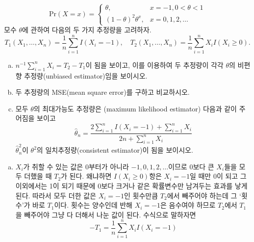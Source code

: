 \documentclass[answers]{exam}
\begin{document}
\begin{questions}
    \begin{equation}
      \mathrm{Pr}\left(X=x\right)=\begin{cases}\theta, & x=-1,0<\theta<1\\ \left(1-\theta\right)^{2}\theta^{x},& x=0,1,2,\ldots  \end{cases}
    \end{equation}
    모수 $\theta$에 관하여 다음의 두 가지 추정량을 고려하자.
    \begin{equation}
      T_{1}\left(X_{1},\ldots,X_{n}\right) = \dfrac{1}{n}\sum_{i=1}^{n}I\left(X_{i}=-1\right),\quad T_{2}\left(X_{1},\ldots,X_{n}\right) = \dfrac{1}{n}\sum_{i=1}^{n}X_{i}I\left(X_{i}\geq 0\right).
    \end{equation}
    \begin{enumerate}[(a)]
      \item $n^{-1}\sum_{i=1}^{n}X_{i}=T_{2}-T_{1}$이 됨을 보이고, 이를 이용하여 두 추정량이 각각 $\theta$의 비편향 추정량(unbiased estimator)임을 보이시오.
      \item 두 추정량의 MSE(mean square error)를 구하고 비교하시오.
      \item 모두 $\theta$의 최대가능도 추정량은 (maximum likelihood estimator) 다음과 같이 주어짐을 보이고
      \begin{equation}
        \widehat{\theta}_{n} = \dfrac{2\displaystyle \sum_{i=1}^{n}I\left(X_{i}=-1\right)+\sum_{i=1}^{n}X_{i}}{2n+\displaystyle \sum_{i=1}^{n}X_{i}}
      \end{equation}
      $\widehat{\theta}_{n}^{2}$이 $\theta^{2}$의 일치추정량(consistent estimator)이 됨을 보이시오.
    \end{enumerate}
    \begin{solution}
      \begin{enumerate}[(a)]
        \item $X_{i}$가 취할 수 있는 값은 $0$부터가 아니라 $-1,0,1,2,\ldots$이므로 0보다 큰 $X_{i}$들을 모두 더했을 때 $T_{2}$가 된다. 왜냐하면 $I\left(X_{i}\geq 0\right)$항은 $X_{i}=-1$일 때만 0이 되고 그 이외에서는 1이 되기 때문에 $0$보다 크거나 같은 확률변수만 남겨두는 효과를 낳게 된다. 따라서 모두 더한 값은 $X_{i}=-1$인 횟수만큼 $T_{2}$에서 빼주어야 하는데 그 `횟수'가 바로 $T_{1}$이다. 횟수는 양수인데 반해 $X_{i}=-1$은 음수여야 하므로 $T_{2}$에서 $T_{1}$을 빼주어야 그냥 다 더해서 나눈 값이 된다. 수식으로 말하자면
        \begin{equation}
          -T_{1} = \dfrac{1}{n}\sum_{i=1}^{n}X_{i}I\left(X_{i}=-1\right)
        \end{equation}

\end{enumerate}
\end{solution}
\end{questions}
\end{document}
